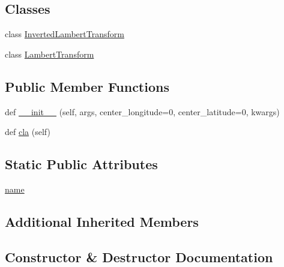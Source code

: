 \subsection*{Classes}
\begin{DoxyCompactItemize}
\item 
class \hyperlink{classmatplotlib_1_1projections_1_1geo_1_1LambertAxes_1_1InvertedLambertTransform}{Inverted\+Lambert\+Transform}
\item 
class \hyperlink{classmatplotlib_1_1projections_1_1geo_1_1LambertAxes_1_1LambertTransform}{Lambert\+Transform}
\end{DoxyCompactItemize}
\subsection*{Public Member Functions}
\begin{DoxyCompactItemize}
\item 
def \hyperlink{classmatplotlib_1_1projections_1_1geo_1_1LambertAxes_ac4ff3277b81974945cec1769cc353032}{\+\_\+\+\_\+init\+\_\+\+\_\+} (self, args, center\+\_\+longitude=0, center\+\_\+latitude=0, kwargs)
\item 
def \hyperlink{classmatplotlib_1_1projections_1_1geo_1_1LambertAxes_acf77a0fa58aab64208f43ffe34b3793e}{cla} (self)
\end{DoxyCompactItemize}
\subsection*{Static Public Attributes}
\begin{DoxyCompactItemize}
\item 
\hyperlink{classmatplotlib_1_1projections_1_1geo_1_1LambertAxes_ac8fb5a693ade68e9ed65cb08f0ab8e43}{name}
\end{DoxyCompactItemize}
\subsection*{Additional Inherited Members}


\subsection{Constructor \& Destructor Documentation}
\mbox{\label{classmatplotlib_1_1projections_1_1geo_1_1LambertAxes_ac4ff3277b81974945cec1769cc353032}} 
